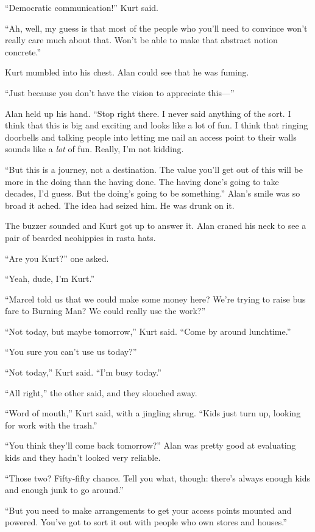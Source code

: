 ``Democratic communication!'' Kurt said.

``Ah, well, my guess is that most of the people who you'll need to
convince won't really care much about that.  Won't be able to make
that abstract notion concrete.''

Kurt mumbled into his chest.  Alan could see that he was fuming.

``Just because you don't have the vision to appreciate this---''

Alan held up his hand.  ``Stop right there.  I never said anything of
the sort.  I think that this is big and exciting and looks like a lot
of fun.  I think that ringing doorbells and talking people into
letting me nail an access point to their walls sounds like a
\textit{lot} of fun.  Really, I'm not kidding.

``But this is a journey, not a destination.  The value you'll get out
of this will be more in the doing than the having done.  The having
done's going to take decades, I'd guess.  But the doing's going to be
something.'' Alan's smile was so broad it ached.  The idea had seized
him.  He was drunk on it.

The buzzer sounded and Kurt got up to answer it.  Alan craned his neck
to see a pair of bearded neohippies in rasta hats. 

``Are you Kurt?'' one asked.

``Yeah, dude, I'm Kurt.''

``Marcel told us that we could make some money here?  We're trying to
raise bus fare to Burning Man?  We could really use the work?''

``Not today, but maybe tomorrow,'' Kurt said.  ``Come by around
lunchtime.''

``You sure you can't use us today?''

``Not today,'' Kurt said.  ``I'm busy today.''

``All right,'' the other said, and they slouched away.

``Word of mouth,'' Kurt said, with a jingling shrug.  ``Kids just turn
up, looking for work with the trash.''

``You think they'll come back tomorrow?'' Alan was pretty good at
evaluating kids and they hadn't looked very reliable.

``Those two?  Fifty-fifty chance.  Tell you what, though:  there's
always enough kids and enough junk to go around.''

``But you need to make arrangements to get your access points mounted
and powered.  You've got to sort it out with people who own stores and
houses.''

